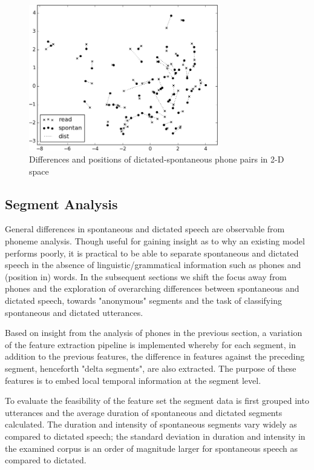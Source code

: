 \documentclass[conference]{IEEEtran}
\begin{document}
\begin{figure}[!htb]
\centering
\includegraphics[width=3.25in]{perphon_dist1}
    \caption{Differences and positions of dictated-spontaneous phone pairs in 2-D space}
\label{phon_pca}
\end{figure}

\subsection{Segment Analysis}

General differences in spontaneous and dictated speech are observable from phoneme analysis.
Though useful for gaining insight as to why an existing model performs poorly, it is practical to be able to separate spontaneous and dictated speech in the absence of linguistic/grammatical information such as phones and (position in) words.
In the subsequent sections we shift the focus away from phones and the exploration of overarching differences between spontaneous and dictated speech, towards "anonymous" segments and the task of classifying spontaneous and dictated utterances. 

Based on insight from the analysis of phones in the previous section, a variation of the feature extraction pipeline is implemented whereby for each segment, in addition to the previous features, the difference in features against the preceding segment, henceforth "delta segments", are also extracted.
The purpose of these features is to embed local temporal information at the segment level.

To evaluate the feasibility of the feature set the segment data is first grouped into utterances and the average duration of spontaneous and dictated segments calculated.
The duration and intensity of spontaneous segments vary widely as compared to dictated speech; the standard deviation in duration and intensity in the examined corpus is an order of magnitude larger for spontaneous speech as compared to dictated.
\end{document}
